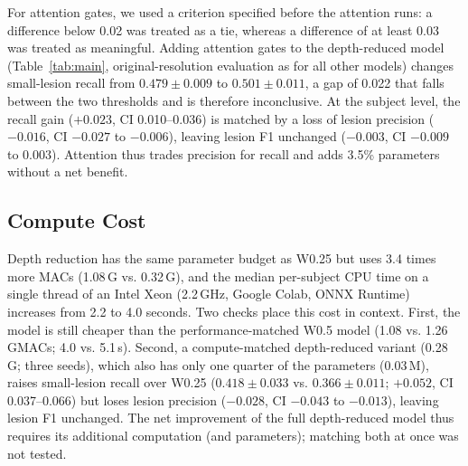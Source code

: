\documentclass[conference]{IEEEtran}
\begin{document}
For attention gates, we used a criterion specified before the attention
runs: a difference below 0.02 was treated as a tie, whereas a difference
of at least 0.03 was treated as meaningful. Adding attention gates to the
depth-reduced model (Table~\ref{tab:main}, original-resolution evaluation
as for all other models) changes small-lesion recall from $0.479 \pm 0.009$ to $0.501 \pm 0.011$, a
gap of 0.022 that falls between the two thresholds and is therefore
inconclusive. At the subject level, the recall gain ($+0.023$, CI
0.010--0.036) is matched by a loss of lesion precision ($-0.016$, CI
$-0.027$ to $-0.006$), leaving lesion F1 unchanged ($-0.003$, CI $-0.009$
to 0.003). Attention thus trades precision for recall and adds 3.5\%
parameters without a net benefit.

\subsection{Compute Cost}

Depth reduction has the same parameter budget as W0.25 but uses 3.4 times
more MACs (1.08\,G vs. 0.32\,G), and the median per-subject CPU time on a
single thread of an Intel Xeon (2.2\,GHz, Google Colab, ONNX Runtime)
increases from 2.2 to 4.0 seconds. Two checks place this cost in context. First, the model is still
cheaper than the performance-matched W0.5 model (1.08 vs. 1.26\,GMACs;
4.0 vs. 5.1\,s). Second, a compute-matched depth-reduced variant
(0.28\,G; three seeds), which also has only one quarter of the parameters
(0.03\,M), raises small-lesion recall over
W0.25 ($0.418 \pm 0.033$ vs. $0.366 \pm 0.011$; $+0.052$, CI 0.037--0.066)
but loses lesion precision ($-0.028$, CI $-0.043$ to $-0.013$), leaving
lesion F1 unchanged. The net improvement of the full depth-reduced model
thus requires its additional computation (and parameters); matching both
at once was not tested.

\end{document}
